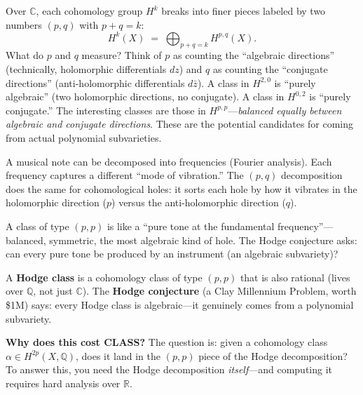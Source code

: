 \documentclass[11pt,twoside,openany]{report}
\theoremstyle{remark}
\newcommand{\CLASS}{\textsf{CLASS}}
\begin{document}
Over $\mathbb{C}$, each cohomology group $H^k$ breaks into finer pieces labeled by two numbers $(p, q)$ with $p + q = k$:
\[
  H^k(X) \;=\; \bigoplus_{p+q=k} H^{p,q}(X).
\]
What do $p$ and $q$ measure? Think of $p$ as counting the ``algebraic directions'' (technically, holomorphic differentials $dz$) and $q$ as counting the ``conjugate directions'' (anti-holomorphic differentials $d\bar{z}$). A class in $H^{2,0}$ is ``purely algebraic'' (two holomorphic directions, no conjugate). A class in $H^{0,2}$ is ``purely conjugate.'' The interesting classes are those in $H^{p,p}$---\emph{balanced equally between algebraic and conjugate directions}. These are the potential candidates for coming from actual polynomial subvarieties.

\begin{analogybox}
A musical note can be decomposed into frequencies (Fourier analysis). Each frequency captures a different ``mode of vibration.'' The $(p,q)$ decomposition does the same for cohomological holes: it sorts each hole by how it vibrates in the holomorphic direction ($p$) versus the anti-holomorphic direction ($q$).

A class of type $(p,p)$ is like a ``pure tone at the fundamental frequency''---balanced, symmetric, the most algebraic kind of hole. The Hodge conjecture asks: can every pure tone be produced by an instrument (an algebraic subvariety)?
\end{analogybox}

A \textbf{Hodge class} is a cohomology class of type $(p,p)$ that is also rational (lives over $\mathbb{Q}$, not just $\mathbb{C}$). The \textbf{Hodge conjecture} (a Clay Millennium Problem, worth \$1M) says: every Hodge class is algebraic---it genuinely comes from a polynomial subvariety.

\medskip
\textbf{Why does this cost \CLASS?} The question is: given a cohomology class $\alpha \in H^{2p}(X, \mathbb{Q})$, does it land in the $(p,p)$ piece of the Hodge decomposition? To answer this, you need the Hodge decomposition \emph{itself}---and computing it requires hard analysis over $\mathbb{R}$.
\end{document}
